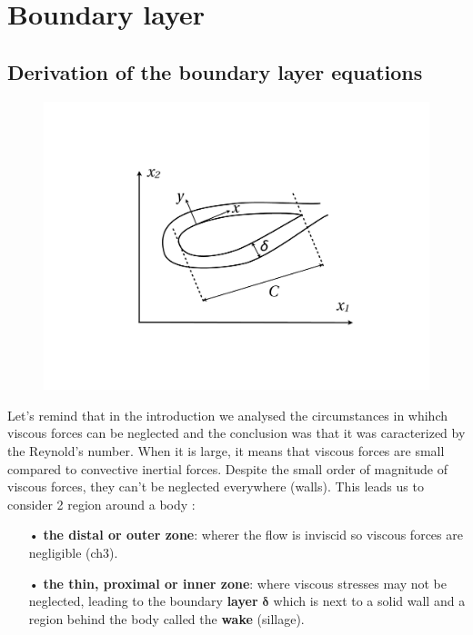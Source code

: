 
\chapter{Boundary layer}

\section{Derivation of the boundary layer equations}
	\begin{figure}
	\vspace{-5mm}
	\includegraphics[scale=0.23]{ch5/1}
	\end{figure}
	Let's remind that in the introduction we analysed the circumstances in whihch viscous forces can be neglected and the conclusion was that it was caracterized by the Reynold's number. When it is large, it means that viscous forces are small compared to convective inertial forces. Despite the small order of magnitude of viscous forces, they can't be neglected everywhere (walls). This leads us to consider 2 region around a body : 
	\ \\
	\begin{itemize}
		\item[•] \textbf{the distal or outer zone}: wherer the flow is inviscid so viscous forces are negligible (ch3). 
		\item[•] \textbf{the thin, proximal or inner zone}: where viscous stresses may not be neglected, leading to the boundary \textbf{layer} $\mathbf{\delta}$ which is next to a solid wall and a region behind the body called the \textbf{wake} (sillage). \\
	\end{itemize}
	
